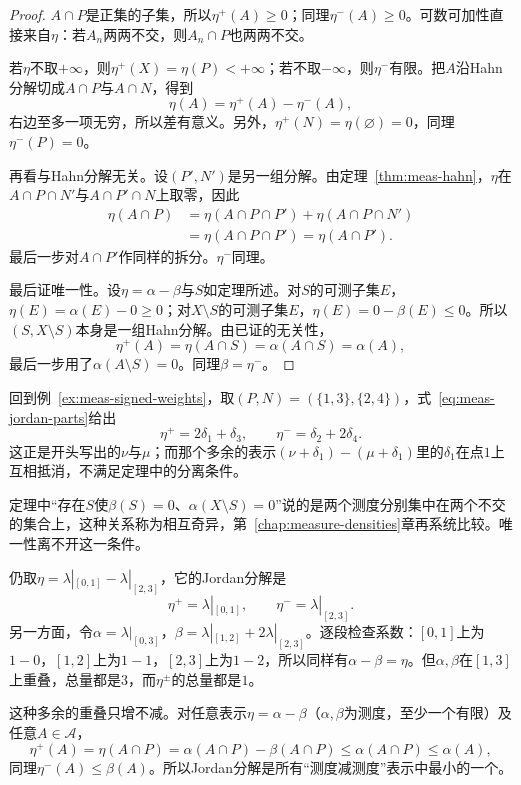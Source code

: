 \begin{proof}
$A\cap P$是正集的子集，所以$\eta^+(A)\geq0$；同理$\eta^-(A)\geq0$。可数可加性直接来自$\eta$：若$A_n$两两不交，则$A_n\cap P$也两两不交。

若$\eta$不取$+\infty$，则$\eta^+(X)=\eta(P)<+\infty$；若不取$-\infty$，则$\eta^-$有限。把$A$沿Hahn分解切成$A\cap P$与$A\cap N$，得到
\[
 \eta(A)=\eta^+(A)-\eta^-(A),
\]
右边至多一项无穷，所以差有意义。另外，$\eta^+(N)=\eta(\varnothing)=0$，同理$\eta^-(P)=0$。

再看与Hahn分解无关。设$(P',N')$是另一组分解。由定理~\ref{thm:meas-hahn}，$\eta$在$A\cap P\cap N'$与$A\cap P'\cap N$上取零，因此
\[
\begin{aligned}
 \eta(A\cap P)&=\eta(A\cap P\cap P')+\eta(A\cap P\cap N')\\
 &=\eta(A\cap P\cap P')=\eta(A\cap P').
\end{aligned}
\]
最后一步对$A\cap P'$作同样的拆分。$\eta^-$同理。

最后证唯一性。设$\eta=\alpha-\beta$与$S$如定理所述。对$S$的可测子集$E$，$\eta(E)=\alpha(E)-0\geq0$；对$X\setminus S$的可测子集$E$，$\eta(E)=0-\beta(E)\leq0$。所以$(S,X\setminus S)$本身是一组Hahn分解。由已证的无关性，
\[
 \eta^+(A)=\eta(A\cap S)=\alpha(A\cap S)=\alpha(A),
\]
最后一步用了$\alpha(A\setminus S)=0$。同理$\beta=\eta^-$。
\end{proof}

回到例~\ref{ex:meas-signed-weights}，取$(P,N)=(\{1,3\},\{2,4\})$，式~\eqref{eq:meas-jordan-parts}给出
\[
 \eta^+=2\delta_1+\delta_3,\qquad\eta^-=\delta_2+2\delta_4.
\]
这正是开头写出的$\nu$与$\mu$；而那个多余的表示$(\nu+\delta_1)-(\mu+\delta_1)$里的$\delta_1$在点$1$上互相抵消，不满足定理中的分离条件。

定理中“存在$S$使$\beta(S)=0$、$\alpha(X\setminus S)=0$”说的是两个测度分别集中在两个不交的集合上，这种关系称为相互奇异，第~\ref{chap:measure-densities}章再系统比较。唯一性离不开这一条件。

仍取$\eta=\lambda|_{[0,1]}-\lambda|_{[2,3]}$，它的Jordan分解是
\[
 \eta^+=\lambda|_{[0,1]},\qquad\eta^-=\lambda|_{[2,3]}.
\]
另一方面，令$\alpha=\lambda|_{[0,3]}$，$\beta=\lambda|_{[1,2]}+2\lambda|_{[2,3]}$。逐段检查系数：$[0,1]$上为$1-0$，$[1,2]$上为$1-1$，$[2,3]$上为$1-2$，所以同样有$\alpha-\beta=\eta$。但$\alpha,\beta$在$[1,3]$上重叠，总量都是$3$，而$\eta^\pm$的总量都是$1$。

这种多余的重叠只增不减。对任意表示$\eta=\alpha-\beta$（$\alpha,\beta$为测度，至少一个有限）及任意$A\in\mathcal A$，
\[
 \eta^+(A)=\eta(A\cap P)=\alpha(A\cap P)-\beta(A\cap P)\leq\alpha(A\cap P)\leq\alpha(A),
\]
同理$\eta^-(A)\leq\beta(A)$。所以Jordan分解是所有“测度减测度”表示中最小的一个。

